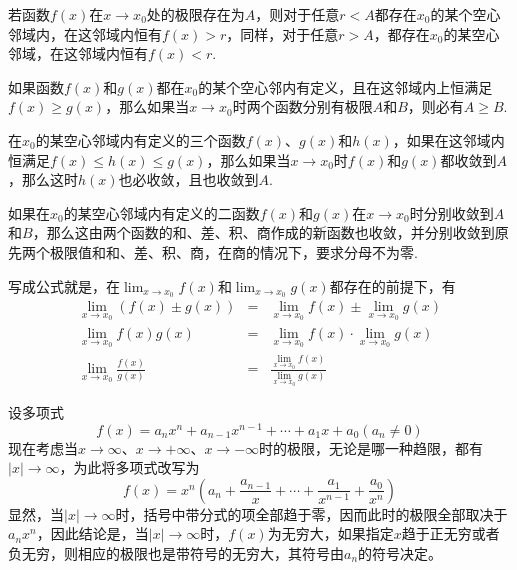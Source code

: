 \begin{theorem}[局部保号性]
  若函数$f(x)$在$x \to x_0$处的极限存在为$A$，则对于任意$r<A$都存在$x_0$的某个空心邻域内，在这邻域内恒有$f(x)>r$，同样，对于任意$r>A$，都存在$x_0$的某空心邻域，在这邻域内恒有$f(x)<r$.
\end{theorem}

\begin{theorem}[保不等式性]
 如果函数$f(x)$和$g(x)$都在$x_0$的某个空心邻内有定义，且在这邻域内上恒满足$f(x) \geqslant g(x)$，那么如果当$x \to x_0$时两个函数分别有极限$A$和$B$，则必有$A \geqslant B$.
\end{theorem}

\begin{theorem}[夹逼定理]
  在$x_0$的某空心邻域内有定义的三个函数$f(x)$、$g(x)$和$h(x)$，如果在这邻域内恒满足$f(x) \leqslant h(x) \leqslant g(x)$，那么如果当$x \to x_0$时$f(x)$和$g(x)$都收敛到$A$，那么这时$h(x)$也必收敛，且也收敛到$A$.
\end{theorem}

\begin{theorem}[四则运算法则]
  如果在$x_0$的某空心邻域内有定义的二函数$f(x)$和$g(x)$在$x \to x_0$时分别收敛到$A$和$B$，那么这由两个函数的和、差、积、商作成的新函数也收敛，并分别收敛到原先两个极限值和和、差、积、商，在商的情况下，要求分母不为零.
\end{theorem}

写成公式就是，在$\lim_{x \to x_0} f(x)$和$\lim_{x \to x_0}g(x)$都存在的前提下，有
\begin{eqnarray*}
  \lim_{x \to x_0} (f(x) \pm g(x)) & = & \lim_{x \to x_0} f(x) \pm \lim_{x \to x_0} g(x)  \\
  \lim_{x \to x_0} f(x)g(x) & = & \lim_{x \to x_0} f(x) \cdot \lim_{x \to x_0} g(x)  \\
  \lim_{x \to x_0} \frac{f(x)}{g(x)} & = & \frac{\lim_{x \to x_0} f(x)}{\lim_{x \to x_0} g(x)}  
\end{eqnarray*}

\begin{example}
  \label{example:limit-of-polynome-when-x-to-infty}
  设多项式
  \[ f(x)=a_nx^n+a_{n-1}x^{n-1}+\cdots+a_1x+a_0 (a_n \neq 0) \]
  现在考虑当$x \to \infty$、$x \to +\infty$、$x \to -\infty$时的极限，无论是哪一种趋限，都有$|x| \to \infty$，为此将多项式改写为
  \[ f(x) = x^n \left( a_n+\frac{a_{n-1}}{x}+\cdots+\frac{a_1}{x^{n-1}}+\frac{a_0}{x^n} \right) \]
  显然，当$|x| \to \infty$时，括号中带分式的项全部趋于零，因而此时的极限全部取决于$a_nx^n$，因此结论是，当$|x| \to \infty$时，$f(x)$为无穷大，如果指定$x$趋于正无穷或者负无穷，则相应的极限也是带符号的无穷大，其符号由$a_n$的符号决定。
\end{example}

